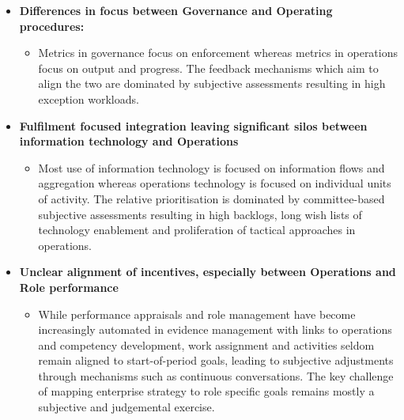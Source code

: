 \begin{itemize}
    \item \textbf{Differences in focus between Governance and Operating procedures:}
    \begin{itemize}
        \item Metrics in governance focus on enforcement whereas metrics in operations focus on output and progress.
        The feedback mechanisms which aim to align the two are dominated by subjective assessments resulting in
        high exception workloads.
    \end{itemize}
    \item \textbf{Fulfilment focused integration leaving significant silos between information technology and
        Operations}
    \begin{itemize}
        \item Most use of information technology is focused on information flows and aggregation whereas operations
        technology is focused on individual units of activity. The relative prioritisation is dominated by
        committee-based subjective assessments resulting in high backlogs,
        long wish lists of technology enablement and proliferation of tactical approaches in operations.
    \end{itemize}
    \item \textbf{Unclear alignment of incentives, especially between Operations and Role performance}
    \begin{itemize}
        \item While performance appraisals and role management have become increasingly automated in evidence
        management with links to operations and competency development, work assignment and activities seldom
        remain aligned to start-of-period goals, leading to subjective adjustments through mechanisms such as
        continuous conversations.
        The key challenge of mapping enterprise strategy to role specific goals remains mostly a
        subjective and judgemental exercise.
    \end{itemize}
\end{itemize}




